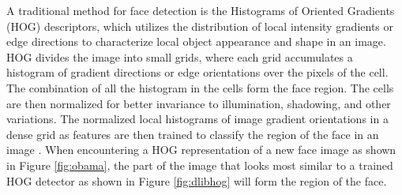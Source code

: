 \documentclass[12pt,english]{article}
\begin{document}
\quad

A traditional method for face detection is the Histograms of Oriented Gradients (HOG) descriptors, which utilizes the distribution of local intensity gradients or edge directions to characterize local object appearance and shape in an image. HOG divides the image into small grids, where each grid accumulates a histogram of gradient directions or edge orientations over the pixels of the cell. The combination of all the histogram in the cells form the face region. The cells are then normalized for better invariance to illumination, shadowing, and other variations. The normalized local histograms of image gradient orientations in a dense grid as features are then trained to classify the region of the face in an image \cite{dalal}. When encountering a HOG representation of a new face image as shown in Figure \ref{fig:obama}, the part of the image that looks most similar to a trained HOG detector as shown in Figure \ref{fig:dlibhog} will form the region of the face. 
\end{document}
